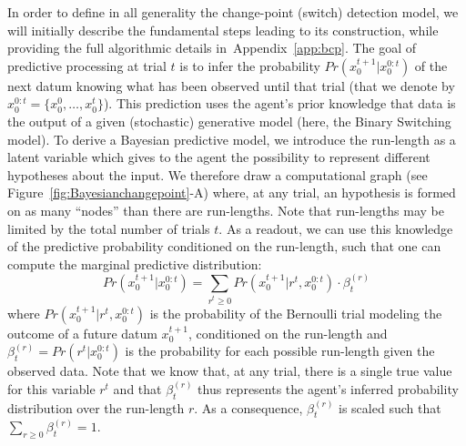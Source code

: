 \documentclass[10pt,letterpaper]{article}
\newcommand{\eql}[1]{\begin{equation}#1\end{equation}}
\newcommand{\seeFig}[1]{Figure~\ref{fig:#1}}
\newcommand{\seeEq}[1]{Equation~\ref{eq:#1}}
\newcommand{\seeApp}[1]{Appendix~\ref{app:#1}}
\begin{document}
In order to define in all generality the change-point (switch) detection model,
we will initially describe the fundamental steps leading to its construction,
while providing the full algorithmic details in~\seeApp{bcp}.
The goal of predictive processing at trial $t$
is to infer the probability $Pr(x_0^{t+1} | x_0^{0:t})$ of the next datum
knowing what has been observed until that trial
(that we denote by $x_0^{0:t} = \{ x_0^0, \ldots, x_0^t \}$).
This prediction uses the agent's prior knowledge
that data is the output of a given (stochastic) generative model (here, the Binary Switching model).
To derive a Bayesian predictive model, we introduce
the run-length as a latent variable which gives to the agent the possibility to represent
different hypotheses about the input.
We therefore draw a computational graph (see \seeFig{Bayesianchangepoint}-A) where, at any trial,
an hypothesis is formed on as many ``nodes'' than there are run-lengths.
Note that run-lengths may be limited by the total number of trials $t$.
%
%
As a readout, we can use this knowledge of the predictive probability conditioned on the run-length,
such that one can compute the marginal predictive distribution:
\eql{
Pr(x_0^{t+1} | x_0^{0:t}) =
\sum_{r^{t}\geq 0} Pr(x_0^{t+1} | r^{t}, x_0^{0:t}) \cdot \beta^{(r)}_t
\label{eq:pred}
}
where $Pr(x_0^{t+1} | r^{t}, x_0^{0:t})$ is the probability of
the Bernoulli trial modeling the outcome of a future datum $x_0^{t+1}$,
conditioned on the run-length and
$\beta^{(r)}_t=Pr(r^t | x_0^{0:t})$ is the probability for each possible run-length given the observed data.
Note that we know that, at any trial, there is a single true value for this variable $r^{t}$
and that $\beta^{(r)}_t$ thus represents the agent's inferred probability distribution over the run-length $r$.
As a consequence, $\beta^{(r)}_t$ is scaled such that $\sum_{r \geq 0 } \beta^{(r)}_t = 1$.
\end{document}
